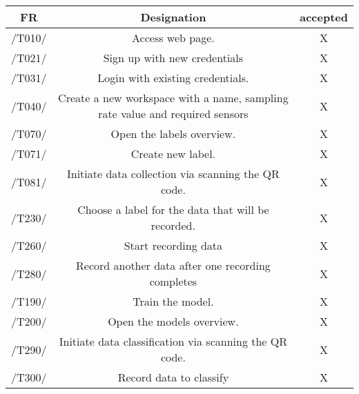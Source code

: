 \begin{table}[h]
\begin{tabular}{!{\VRule}c!{\VRule}c!{\VRule}c!{\VRule}}
 \hline
FR     & Designation                                                                  &accepted              \\
 \hline 
/T010/ & Access web page.                                                             &  X {\color[HTML]{67FD9A} } \\
 \hline
/T021/ & Sign up with new credentials                                                 &  X {\color[HTML]{67FD9A} } \\
 \hline
/T031/ & Login with existing credentials.                                             &  X                       \\
 \hline
/T040/ & Create a new workspace with a name, sampling rate value and required sensors &  X {\color[HTML]{67FD9A} } \\
 \hline
/T070/ & Open the labels overview.                                                    &  X {\color[HTML]{67FD9A} } \\
 \hline
/T071/ & Create new label.                                                            &  X {\color[HTML]{67FD9A} } \\
 \hline
/T081/ & Initiate data collection via scanning the QR code.                           &  X {\color[HTML]{67FD9A} } \\
 \hline
/T230/ & Choose a label for the data that will be recorded.                           &  X {\color[HTML]{67FD9A} } \\
 \hline
/T260/ & Start recording data                                                         &  X {\color[HTML]{67FD9A} } \\
 \hline
/T280/ & Record another data after one recording completes                            &  X {\color[HTML]{67FD9A} } \\
 \hline
/T190/ & Train the model.                                                             &  X {\color[HTML]{67FD9A} } \\
 \hline
/T200/ & Open the models overview.                                                    &  X {\color[HTML]{67FD9A} } \\
 \hline
/T290/ & Initiate data classification via scanning the QR code.                       &  X {\color[HTML]{67FD9A} } \\
 \hline
/T300/ & Record data to classify                                                      &  X {\color[HTML]{67FD9A} } \\
 \hline
\end{tabular}
\end{table}
